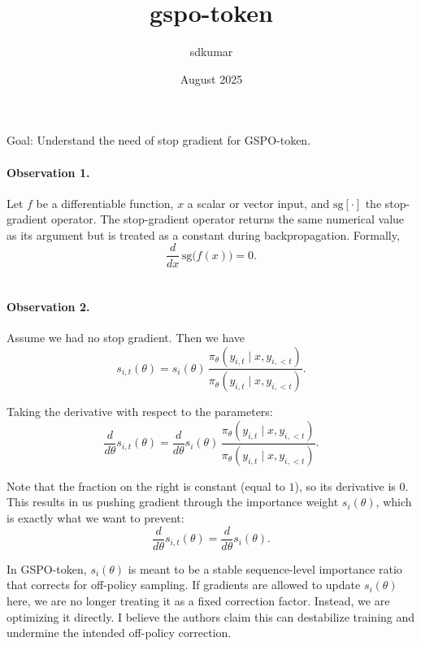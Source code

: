 \documentclass{article}
\title{gspo-token}
\author{sdkumar }
\date{August 2025}
\begin{document}
Goal: Understand the need of stop gradient for GSPO-token. \\

\paragraph{Observation 1.}
Let $f$ be a differentiable function, $x$ a scalar or vector input, and $\mathrm{sg}[\cdot]$ the stop-gradient operator. 
The stop-gradient operator returns the same numerical value as its argument but is treated as a constant during backpropagation. 
Formally,
\[
\frac{d}{dx} \,\mathrm{sg}\!\big(f(x)\big) = 0.
\] \\



\paragraph{Observation 2.}
Assume we had no stop gradient. Then we have
\[
s_{i,t}(\theta) 
= s_{i}(\theta) \,
\frac{\pi_{\theta}(y_{i,t} \mid x, y_{i,<t})}
     {\pi_{\theta}(y_{i,t} \mid x, y_{i,<t})}.
\]

Taking the derivative with respect to the parameters:
\[
\frac{d}{d\theta} s_{i,t}(\theta) 
= \frac{d}{d\theta} s_{i}(\theta) \,
\frac{\pi_{\theta}(y_{i,t} \mid x, y_{i,<t})}
     {\pi_{\theta}(y_{i,t} \mid x, y_{i,<t})}.
\]

Note that the fraction on the right is constant (equal to $1$), so its derivative is $0$. 
This results in us pushing gradient through the importance weight $s_i(\theta)$, which is exactly what we want to prevent:
\[
\frac{d}{d\theta} s_{i,t}(\theta) 
= \frac{d}{d\theta} s_{i}(\theta).
\]

In GSPO-token, $s_i(\theta)$ is meant to be a stable
sequence-level importance ratio that corrects for off-policy sampling. If gradients are allowed
to update $s_i(\theta)$ here, we are no longer treating it as a fixed correction factor.  Instead,
we are optimizing it directly. I believe the authors claim this can destabilize training and undermine
the intended off-policy correction.
\end{document}
